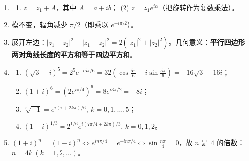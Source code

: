 \begin{enumerate}
\begin{enumerate}
  \item
    \(\dfrac{1-i}{2i}=\dfrac{\sqrt2}{2}e^{-i\pi/4}\)。
  \end{enumerate}
\item
  \begin{enumerate}
  \def\labelenumii{(\arabic{enumii})}
  \tightlist
  \item
    \(z=z_1+A\)，其中 \(A=a+ib\)； (2)
    \(z=z_1e^{i\alpha}\)（把旋转作为复数乘法）。
  \end{enumerate}
\item
  模不变，辐角减少 \(\pi/2\)（即乘以 \(e^{-i\pi/2}\)）。
\item
  展开左边：\(|z_1+z_2|^2+|z_1-z_2|^2=2(|z_1|^2+|z_2|^2)\)。几何意义：\textbf{平行四边形两对角线长度的平方和等于四边平方和}。
\item
  \begin{enumerate}
  \def\labelenumii{(\arabic{enumii})}
  \tightlist
  \item
    \((\sqrt3-i)^5=2^5e^{-i5\pi/6}=32(\cos\frac{5\pi}{6}-i\sin\frac{5\pi}{6})=-16\sqrt3-16i\)；
  \item
    \((1+i)^6=(2e^{i\pi/4})^6=8e^{i3\pi/2}=-8i\)；
  \item
    \(\sqrt[6]{-1}=e^{i(\pi+2k\pi)/6},\ k=0,1,\dots,5\)；
  \item
    \((1-i)^{1/3}=2^{1/6}e^{i(7\pi/4+2k\pi)/3},\ k=0,1,2\)。
  \end{enumerate}
\item
  \((1+i)^n=(1-i)^n \iff e^{in\pi/4}=e^{-in\pi/4}\iff \sin\frac{n\pi}{4}=0\)，故
  \(n\) 是 \(4\) 的倍数：\(n=4k\ (k=1,2,\dots)\)。
\end{enumerate}
